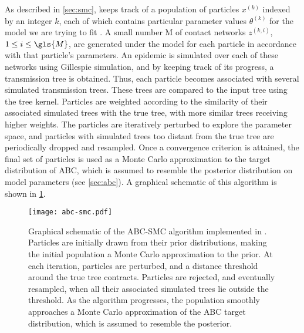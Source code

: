 As described in \cref{sec:smc},  keeps track of a population
of particles $x^{(k)}$ indexed by an integer $k$, each of which contains
particular parameter values $\theta^{(k)}$ for the  model
we are trying to fit . A small number \gls{M} of contact
networks $z^{(k,i)}$, $1 \leq i \leq \gls{M}$, are generated under the model
for each particle in accordance with that particle's parameters. An epidemic is
simulated over each of these networks using Gillespie simulation, and by
keeping track of its progress, a transmission tree is obtained. Thus, each
particle becomes associated with several simulated transmission trees. These
trees are compared to the input tree using the tree kernel. Particles are
weighted according to the similarity of their associated simulated trees with
the true tree, with more similar trees receiving higher weights. The particles
are iteratively perturbed to explore the parameter space, and particles with
simulated trees too distant from the true tree are periodically dropped and
resampled. Once a convergence criterion is attained, the final set of particles
is used as a Monte Carlo approximation to the target distribution of \gls{ABC},
which is assumed to resemble the posterior distribution on model parameters
(see \cref{sec:abc}). A graphical schematic of this algorithm is shown in
\cref{fig:abcsmc}.

\begin{figure}
    \texttt{[image: abc-smc.pdf]}
    \caption[
        Graphical schematic of the ABC-SMC algorithm implemented in .
    ]{
        Graphical schematic of the \gls{ABC}-\gls{SMC} algorithm implemented in
        . Particles are initially drawn from their prior
        distributions, making the initial population a Monte Carlo
        approximation to the prior. At each iteration, particles are perturbed,
        and a distance threshold around the true tree contracts. Particles are
        rejected, and eventually resampled, when all their associated simulated
        trees lie outside the threshold. As the algorithm progresses, the
        population smoothly approaches a Monte Carlo approximation of the
        \gls{ABC} target distribution, which is assumed to resemble the
        posterior.
    }
    \label{fig:abcsmc}
\end{figure}

